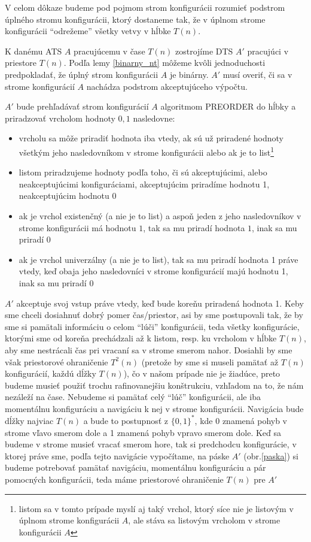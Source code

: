 \begin{dokaz}
V celom dôkaze budeme pod pojmom strom konfigurácii rozumieť
podstrom úplného stromu konfigurácii, ktorý dostaneme tak, že v
úplnom strome konfigurácii ``odrežeme'' všetky vetvy v hĺbke
$T(n)$.

\smallskip
K danému ATS $A$ pracujúcemu v čase $T(n)$ zostrojíme DTS $A'$
pracujúci v priestore $T(n)$. Podľa lemy \ref{binarny_nt} môžeme
kvôli jednoduchosti predpokladať, že úplný strom konfigurácii $A$
je binárny. $A'$ musí overiť, či sa v strome konfigurácií $A$
nachádza podstrom akceptujúceho výpočtu.

\smallskip
$A'$ bude prehľadávať strom konfigurácií $A$ algoritmom PREORDER
do hĺbky a priradzovať vrcholom hodnoty $0,1$ nasledovne:
\begin{itemize}
\item vrcholu sa môže priradiť hodnota iba vtedy, ak sú už
priradené hodnoty všetkým jeho nasledovníkom v strome konfigurácii
alebo ak je to list\footnote{listom sa v tomto prípade myslí aj
taký vrchol, ktorý síce nie je listovým v úplnom strome
konfigurácii $A$, ale stáva sa listovým vrcholom v strome
konfigurácii $A$}
\item listom priradzujeme hodnoty podľa toho, či sú akceptujúcimi,
alebo neakceptujúcimi konfiguráciami, akceptujúcim priradíme
hodnotu 1, neakceptujúcim hodnotu 0
\item ak je vrchol existenčný (a nie je to list)
a aspoň jeden z jeho nasledovníkov v strome konfigurácii má
hodnotu $1$, tak sa mu priradí hodnota $1$, inak sa mu priradí $0$
\item ak je vrchol univerzálny (a nie je to list), tak sa mu priradí
hodnota 1 práve vtedy, keď obaja jeho nasledovníci v strome
konfigurácií majú hodnotu 1, inak sa mu priradí 0
\end{itemize}
$A'$ akceptuje svoj vstup práve vtedy, keď bude koreňu priradená
hodnota 1. Keby sme chceli dosiahnuť dobrý pomer čas/priestor, asi
by sme postupovali tak, že by sme si pamätali informáciu o celom
``lúči'' konfigurácii, teda všetky konfigurácie, ktorými sme od
koreňa prechádzali až k listom, resp. ku vrcholom v hĺbke $T(n)$,
aby sme nestrácali čas pri vracaní sa v strome smerom nahor.
Dosiahli by sme však priestorové ohraničenie $T^2(n)$ (pretože by
sme si museli pamätať až $T(n)$ konfigurácií, každú dĺžky $T(n)$),
čo v našom prípade nie je žiadúce, preto budeme musieť použiť
trochu rafinovanejšiu konštrukciu, vzhľadom na to, že nám nezáleží
na čase. Nebudeme si pamätať celý ``lúč'' konfigurácii, ale iba
momentálnu konfiguráciu a navigáciu k nej v strome konfigurácii.
Navigácia bude dĺžky najviac $T(n)$ a bude to postupnosť z
$\{0,1\}^*$, kde 0 znamená pohyb v strome vľavo smerom dole a 1
znamená pohyb vpravo smerom dole. Keď sa budeme v strome musieť
vracať smerom hore, tak si predchodcu konfigurácie, v ktorej práve
sme, podľa tejto navigácie vypočítame, na páske $A'$
(obr.\ref{paska}) si budeme potrebovať pamätať navigáciu,
momentálnu konfiguráciu a pár pomocných konfigurácii, teda máme
priestorové ohraničenie $T(n)$ pre $A'$
\end{dokaz}

